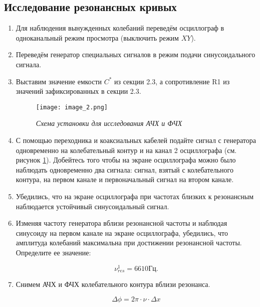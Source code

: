 \documentclass[a4paper,12pt]{article} %
\begin{document}
\newpage

\subsection{Исследование резонансных кривых}

\begin{enumerate}
    \item Для наблюдения вынужденных колебаний переведём осциллограф в одноканальный режим просмотра (выключить режим $XY$). 

    \item Переведём генератор специальных сигналов в режим подачи синусоидального сигнала.

    \item Выставим значение емкости $C^{*}$ из секции 2.3, а сопротивление R1 из значений зафиксированных в секции 2.3.

    \begin{figure}[h]
    \begin{center}
		\texttt{[image: image\_2.png]}
    \end{center}
	\caption{\textit{Схема установки для исследования АЧХ и ФЧХ}}
	\label{image2}
    \end{figure}

    \item  С помощью переходника и коаксиальных кабелей подайте сигнал с генератора одновременно на колебательный контур и на канал 2 осциллографа (см. рисунок \ref{image2}). Добейтесь того чтобы на экране осциллографа можно было наблюдать одновременно два сигнала: сигнал, взятый с колебательного контура, на первом канале и первоначальный сигнал на втором канале.

    \item Убедились, что на экране осциллографа при частотах близких к резонансным наблюдается устойчивый синусоидальный сигнал.

    \item Изменяя частоту генератора вблизи резонансной частоты и наблюдая синусоиду на первом канале на экране осциллографа, убедились, что амплитуда колебаний максимальна при достижении резонансной частоты. Определите ее значение:

    \[ \nu^{1}_{res} = 6610 \text{Гц}. \]

    \item Снимем АЧХ и ФЧХ колебательного контура вблизи резонанса.

    \[ \Delta \phi = 2\pi \cdot \nu \cdot \Delta x \]


\end{enumerate}
\end{document}

